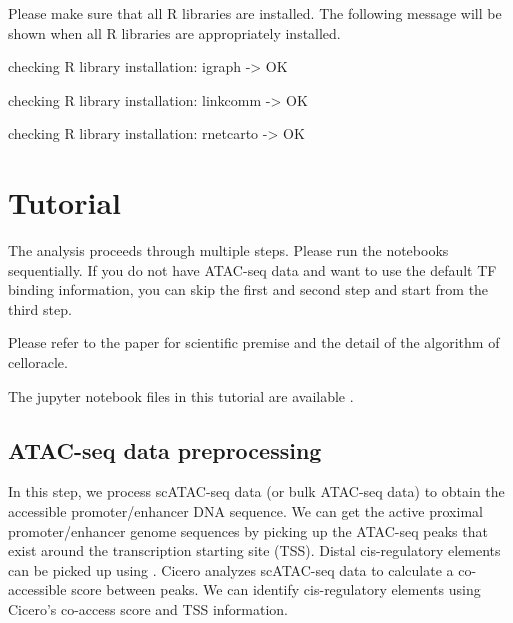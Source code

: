 \documentclass[letterpaper,10pt,english]{sphinxmanual}
\begin{document}
Please make sure that all R libraries are installed. The following message will be shown when all R libraries are appropriately installed.

\begin{DUlineblock}{0em}
\item[] checking R library installation: igraph -\textgreater{} OK
\item[] checking R library installation: linkcomm -\textgreater{} OK
\item[] checking R library installation: rnetcarto -\textgreater{} OK
\end{DUlineblock}


\section{Tutorial}
\label{\detokenize{tutorials/index:tutorial}}\label{\detokenize{tutorials/index:id1}}\label{\detokenize{tutorials/index::doc}}
The analysis proceeds through multiple steps.
Please run the notebooks sequentially.
If you do not have ATAC-seq data and want to use the default TF binding information, you can skip the first and second step and start from the third step.

Please refer to the  paper for scientific premise and the detail of the algorithm of celloracle.

The jupyter notebook files in this tutorial are available  .


\subsection{ATAC-seq data preprocessing}
\label{\detokenize{tutorials/atac:atac-seq-data-preprocessing}}\label{\detokenize{tutorials/atac:atac}}\label{\detokenize{tutorials/atac::doc}}
In this step, we process scATAC-seq data (or bulk ATAC-seq data) to obtain the accessible promoter/enhancer DNA sequence.
We can get the active proximal promoter/enhancer genome sequences by picking up the ATAC-seq peaks that exist around the transcription starting site (TSS).
Distal cis-regulatory elements can be picked up using   .
Cicero analyzes scATAC-seq data to calculate a co-accessible score between peaks.
We can identify cis-regulatory elements using Cicero’s co-access score and TSS information.
\end{document}
